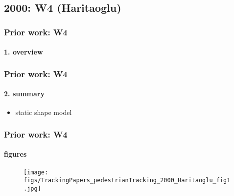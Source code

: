\subsection{2000: W4 (Haritaoglu)}
\begin{frame}
\frametitle{Prior work: W4}
\framesubtitle{1. overview}
\logoCSIPCPL\mypagenum
{}
\end{frame}



\begin{frame}
\frametitle{Prior work: W4}
\framesubtitle{2. summary}
\logoCSIPCPL\mypagenum
{}
	\begin{itemize}
		\item static shape model
	\end{itemize}
\end{frame}




\begin{frame}
\frametitle{Prior work: W4}
\framesubtitle{figures}
\mypagenum
{}
	\begin{figure}
		\texttt{[image: figs/TrackingPapers\_pedestrianTracking\_2000\_Haritaoglu\_fig1.jpg]}
	\end{figure}
\end{frame}